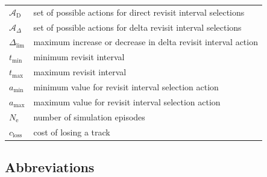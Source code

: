 \documentclass[english, 12pt, a4paper, elec, utf8, a-1b, online]{aaltothesis}
\numberwithin{equation}{section}
\newcommand{\amax}{a_\text{max}}
\newcommand{\amin}{a_\text{min}}
\newcommand{\Ne}{N_\text{e}}
\newcommand{\As}{\mathcal{A}}
\newcommand{\tmax}{t_\text{max}}
\newcommand{\tmin}{t_\text{min}}
\newcommand{\deltalim}{\Delta_\text{lim}}
\newcommand{\Asdir}{\As_\text{D}}
\newcommand{\Asdelta}{\As_\Delta}
\newcommand{\closs}{c_\text{loss}}
\begin{document}
\begin{longtable}{ll}
$\Asdir$ & set of possible actions for direct revisit interval selections \\
$\Asdelta$ & set of possible actions for delta revisit interval selections \\
$\deltalim$ & maximum increase or decrease in delta revisit interval action \\
$\tmin$ & minimum revisit interval \\
$\tmax$ & maximum revisit interval \\
$\amin$ & minimum value for revisit interval selection action \\
$\amax$ & maximum value for revisit interval selection action \\
$\Ne$ & number of simulation episodes \\
$\closs$ & cost of losing a track \\
\end{longtable}

\subsection*{Abbreviations}
\end{document}
